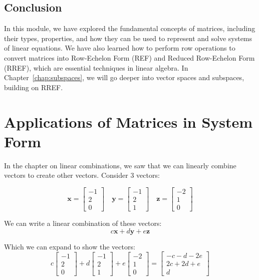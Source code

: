 \subsection{Conclusion}
In this module, we have explored the fundamental concepts of matrices, including their types, properties, and how they can be used to represent and solve systems of linear equations. We have also learned how to perform row operations to convert matrices into Row-Echelon Form (REF) and Reduced Row-Echelon Form (RREF), which are essential techniques in linear algebra. In Chapter~\ref{chap:subspaces}, we will go deeper into vector spaces and subspaces, building on RREF.


\section{Applications of Matrices in System Form}

In the chapter on linear combinations, we saw that we can linearly combine vectors to create other vectors. Consider 3 vectors:

$$\textbf{x} = \begin{bmatrix}
-1\\
2\\
0
\end{bmatrix}\quad \textbf{y} = \begin{bmatrix}
-1\\
2\\
1
\end{bmatrix}\quad \textbf{z} = \begin{bmatrix}
-2\\
1\\
0
\end{bmatrix}$$

We can write a linear combination of these vectors:
$$c\textbf{x} + d\textbf{y} + e\textbf{z}$$

Which we can expand to show the vectors:
$$c \begin{bmatrix}
-1\\
2\\
0
\end{bmatrix} + d \begin{bmatrix}
-1\\
2\\
1
\end{bmatrix} + e \begin{bmatrix}
-2\\
1\\
0
\end{bmatrix} = \begin{bmatrix}
-c - d - 2e\\
2c + 2d + e\\
d
\end{bmatrix}$$

